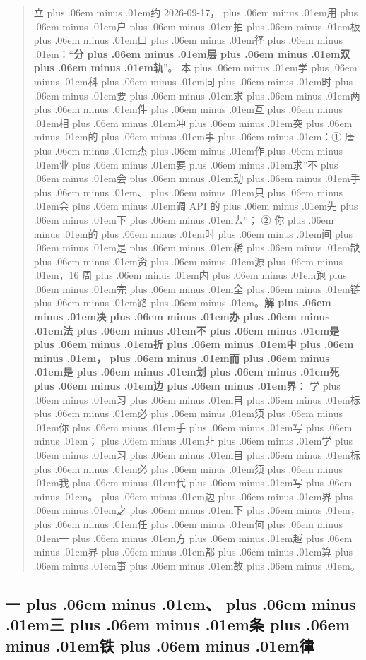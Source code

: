 \documentclass[
]{article}
\def\zh#1{{\zhfont #1}}
\def\sym#1{{\symfont #1}}
\def\zhglue{\hskip0pt plus .06em minus .01em}
\begin{document}
\begin{quote}
\zh{立\zhglue 约} 2026-09-17\zh{，\zhglue 用\zhglue 户\zhglue 拍\zhglue 板\zhglue 口\zhglue 径\zhglue ：}``\textbf{\zh{分\zhglue 层\zhglue 双\zhglue 轨}}''\zh{。} \zh{本\zhglue 学\zhglue 科\zhglue 同\zhglue 时\zhglue 要\zhglue 求\zhglue 两\zhglue 件\zhglue 互\zhglue 相\zhglue 冲\zhglue 突\zhglue 的\zhglue 事\zhglue ：}\sym{①} \zh{唐\zhglue 杰\zhglue 作\zhglue 业\zhglue 要\zhglue 求}''\zh{不\zhglue 会\zhglue 动\zhglue 手\zhglue 、\zhglue 只\zhglue 会\zhglue 调} API \zh{的\zhglue 先\zhglue 下\zhglue 去}''\zh{；} \sym{②} \zh{你\zhglue 的\zhglue 时\zhglue 间\zhglue 是\zhglue 稀\zhglue 缺\zhglue 资\zhglue 源\zhglue ，}16 \zh{周\zhglue 内\zhglue 跑\zhglue 完\zhglue 全\zhglue 链\zhglue 路\zhglue 。}\textbf{\zh{解\zhglue 决\zhglue 办\zhglue 法\zhglue 不\zhglue 是\zhglue 折\zhglue 中\zhglue ，\zhglue 而\zhglue 是\zhglue 划\zhglue 死\zhglue 边\zhglue 界}}\zh{：} \zh{学\zhglue 习\zhglue 目\zhglue 标\zhglue 必\zhglue 须\zhglue 你\zhglue 手\zhglue 写\zhglue ；\zhglue 非\zhglue 学\zhglue 习\zhglue 目\zhglue 标\zhglue 必\zhglue 须\zhglue 我\zhglue 代\zhglue 写\zhglue 。\zhglue 边\zhglue 界\zhglue 之\zhglue 下\zhglue ，\zhglue 任\zhglue 何\zhglue 一\zhglue 方\zhglue 越\zhglue 界\zhglue 都\zhglue 算\zhglue 事\zhglue 故\zhglue 。}
\end{quote}

\subsection{\zh{一\zhglue 、\zhglue 三\zhglue 条\zhglue 铁\zhglue 律}}\label{ux4e00ux4e09ux6761ux94c1ux5f8b}
\end{document}

